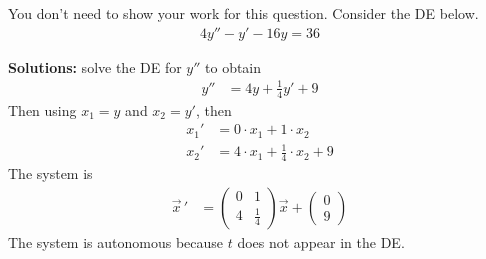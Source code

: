 \ifnum {}
\question[2] You don't need to show your work for this question. Consider the DE below.
\begin{align*}
    4y'' - y' - 16y = 36
\end{align*}
\ifnum {} {\color{DarkBlue} 
\textbf{Solutions:} solve the DE for $y''$ to obtain
\begin{align}
    y'' &= 4 y + \frac14 y' + 9
\end{align}
Then using $x_1 = y$ and $x_2 = y'$, then 
\begin{align}
    x_1 ' &= 0\cdot x_1 + 1\cdot x_2 \\
    x_2' &=  4\cdot x_1 + \frac14 \cdot x_2 + 9
\end{align}
The system is
\begin{align}
    \vec x \, ' &= \begin{pmatrix} 0&1\\4&\frac14 \end{pmatrix} \vec x + \begin{pmatrix} 0\\9\end{pmatrix}
\end{align}
The system is  autonomous because $t$ does not appear in the DE. 
} 
\else 
\fi
\fi 
